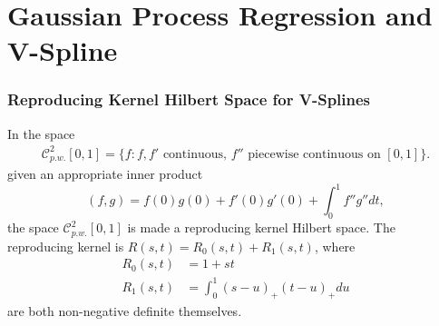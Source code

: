 \documentclass{beamer}
\begin{document}
\section{Gaussian Process Regression and V-Spline}

\begin{frame}
\frametitle{Reproducing Kernel Hilbert Space for V-Splines}

In the space \begin{align*}
\mathcal{C}_{p.w.}^{2}[0,1]=\{f:f,f' \mbox{ continuous, } f'' \mbox{ piecewise continuous on } [0,1] \}.
\end{align*} 
given an appropriate inner product
\begin{equation}
(f,g)=f(0) g(0)+f'(0) g'(0)+\int_{0}^{1}f''g''dt,
\end{equation}
the space $\mathcal{C}_{p.w.}^{2}[0,1]$ is made a reproducing kernel Hilbert space. The reproducing kernel is $R(s,t)=R_0(s,t)+R_1(s,t)$, where
\begin{align} \label{TractorSplineKernelR0}
R_0(s,t)&=1+st \\ \label{TractorSplineKernelR1}
R_1(s,t)&=\int_{0}^{1} (s-u)_+(t-u)_+du
\end{align}
are both non-negative definite themselves.


\end{frame}

\end{document}
